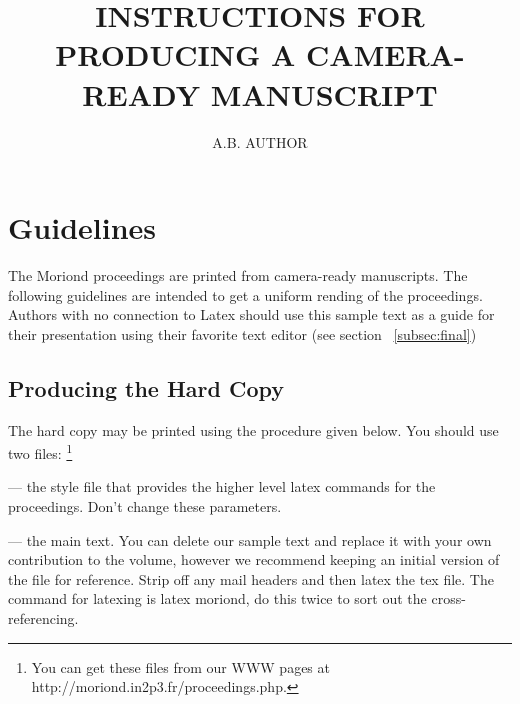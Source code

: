 \documentclass[11pt]{article}
\begin{document}
\vspace*{4cm}
\title{INSTRUCTIONS FOR PRODUCING A CAMERA-READY MANUSCRIPT}

\author{ A.B. AUTHOR }

\address{Department of Physics, Theoretical Physics, 1 Keble Road,\\
Oxford OX1 3NP, England}

\maketitle{}

\section{Guidelines}
The Moriond proceedings are printed from camera-ready manuscripts.
The following guidelines are intended to get a uniform rending of the 
proceedings. Authors with no connection to Latex should use this
sample text as a guide for their presentation using their favorite
text editor (see section ~\ref{subsec:final})
\subsection{Producing the Hard Copy}\label{subsec:prod}

The hard copy may be printed using the procedure given below.
You should use
two files: \footnote{You can get these files from
our WWW pages at {\sf http://moriond.in2p3.fr/proceedings.php}.}

 --- the style file that provides the higher
level latex commands for the proceedings. Don't change these parameters.

 --- the main text. You can delete our sample
text and replace it with your own contribution to the volume, however we
recommend keeping an initial version of the file for reference.
Strip off any mail headers and then latex the tex file.
The command for latexing is {\sf latex moriond}, do this twice to
sort out the cross-referencing.
\end{document}
